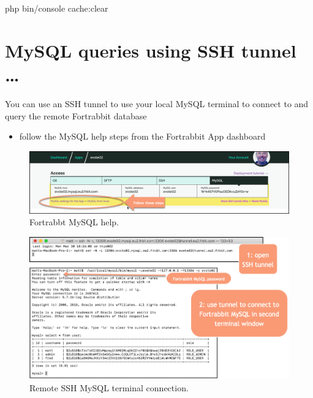 \documentclass[a4paperpaper,openright]{book}
\newenvironment{Shaded}{}{}
\newcommand{\ExtensionTok}[1]{#1}
\newcommand{\NormalTok}[1]{#1}
\providecommand{\tightlist}{%
  \setlength{\itemsep}{0pt}\setlength{\parskip}{0pt}}
\begin{document}
\begin{Shaded}
\begin{Highlighting}[]
    \ExtensionTok{php}\NormalTok{ bin/console cache:clear}
\end{Highlighting}
\end{Shaded}

\hypertarget{mysql-queries-using-ssh-tunnel}{%
\section{MySQL queries using SSH tunnel
\ldots{}}\label{mysql-queries-using-ssh-tunnel}}

You can use an SSH tunnel to use your local MySQL terminal to connect to
and query the remote Fortrabbit database

\begin{itemize}
\tightlist
\item
  follow the MySQL help steps from the Fortrabbit App dashboard
\end{itemize}

\begin{figure}
\centering
\includegraphics{./tex2pdf.-5a4428120ede4be1/a165c9dd7a746479c0c71da7102bdb2b6f5748ea.png}
\caption{Fortrabbt MySQL help.}
\end{figure}

\begin{figure}
\centering
\includegraphics{./tex2pdf.-5a4428120ede4be1/4a831ca76089eb2616508f4c80b41db0ca4d5969.png}
\caption{Remote SSH MySQL terminal connection.}
\end{figure}
\end{document}
